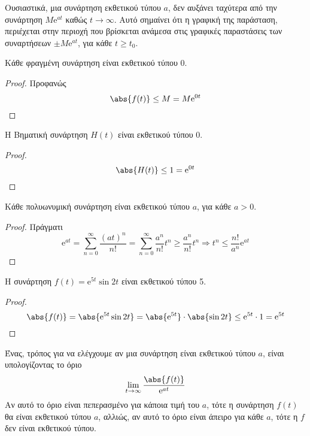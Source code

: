 \begin{rem}
  Ουσιαστικά, μια συνάρτηση εκθετικού τύπου $a$, δεν αυξάνει ταχύτερα από την 
  συνάρτηση $ M \mathrm{e}^{at} $ καθώς $ t \to \infty $. Αυτό σημαίνει ότι η 
  γραφική της παράσταση, περιέχεται στην περιοχή που βρίσκεται ανάμεσα στις 
  γραφικές παραστάσεις των συναρτήσεων 
  $ \pm M \mathrm{e}^{at}$, για κάθε $ t \geq t_{0} $.
\end{rem}

\begin{prop}
  Κάθε φραγμένη συνάρτηση είναι εκθετικού τύπου 0.
\end{prop}
\begin{proof}
  Προφανώς
  \[
    \abs{f(t)} \leq M = M \mathrm{e}^{0t}
  \] 
\end{proof}

\begin{example}
  Η Βηματική συνάρτηση $ H(t) $ είναι εκθετικού τύπου 0.
  \begin{proof}
    \[
      \abs{H(t)} \leq 1 = \mathrm{e}^{0t} 
    \] 
  \end{proof}
\end{example}

\begin{prop}
  Κάθε πολυωνυμική συνάρτηση είναι εκθετικού τύπου $a$, για κάθε $ a>0 $.
\end{prop}
\begin{proof}
  Πράγματι
  \[
    \mathrm{e}^{at} = \sum_{n=0}^{\infty} \frac{(at)^{n}}{n!} = \sum_{n=0}^{\infty} 
    \frac{a^{n}}{n!} t^{n} \geq \frac{a^{n}}{n!} t^{n} \Rightarrow t^{n} \leq
    \frac{n!}{a^{n}} \mathrm{e}^{at}
  \]
\end{proof}

\begin{example}
  Η συνάρτηση $ f(t) = \mathrm{e}^{5t} \sin{2t} $ είναι εκθετικού τύπου 5.
  \begin{proof}
    \[
      \abs{f(t)} = \abs{\mathrm{e}^{5t} \sin{2t}} = \abs{\mathrm{e}^{5t}} \cdot 
      \abs{\sin{2t}} \leq \mathrm{e}^{5t} \cdot 1 = \mathrm{e}^{5t}
    \] 
  \end{proof}
\end{example}

\begin{rem}
  Ένας, τρόπος για να ελέγχουμε αν μια συνάρτηση είναι εκθετικού τύπου $a$, είναι 
  υπολογίζοντας το όριο
  \[
    \lim_{t \to \infty} \frac{\abs{f(t)}}{\mathrm{e}^{at}} 
  \] 
  Αν αυτό το όριο είναι πεπερασμένο για κάποια τιμή του $a$, τότε η συνάρτηση $ f(t)
  $ θα είναι εκθετικού τύπου $a$, αλλιώς, αν αυτό το όριο είναι άπειρο για κάθε $a$, 
  τότε η $f$ δεν είναι εκθετικού τύπου.
\end{rem}


